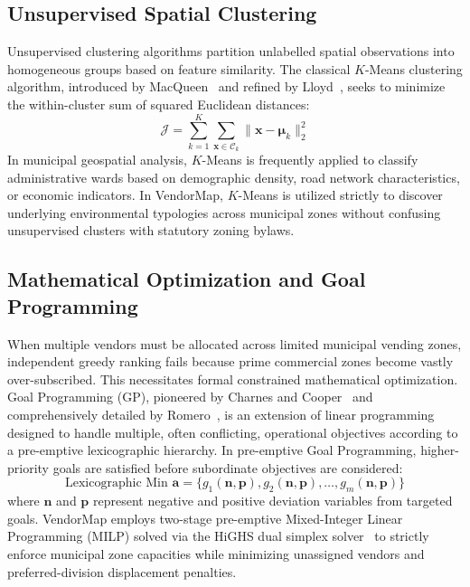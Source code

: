 \subsection{Unsupervised Spatial Clustering}
Unsupervised clustering algorithms partition unlabelled spatial observations into homogeneous groups based on feature similarity. The classical $K$-Means clustering algorithm, introduced by MacQueen~\cite{macqueen1967some} and refined by Lloyd~\cite{lloyd1982least}, seeks to minimize the within-cluster sum of squared Euclidean distances:
\begin{equation}
    \mathcal{J} = \sum_{k=1}^K \sum_{\mathbf{x} \in \mathcal{C}_k} \|\mathbf{x} - \mathbf{\mu}_k\|_2^2
    \label{eq:lit_kmeans}
\end{equation}
In municipal geospatial analysis, $K$-Means is frequently applied to classify administrative wards based on demographic density, road network characteristics, or economic indicators. In VendorMap, $K$-Means is utilized strictly to discover underlying environmental typologies across municipal zones without confusing unsupervised clusters with statutory zoning bylaws.

\subsection{Mathematical Optimization and Goal Programming}
When multiple vendors must be allocated across limited municipal vending zones, independent greedy ranking fails because prime commercial zones become vastly over-subscribed. This necessitates formal constrained mathematical optimization. Goal Programming (GP), pioneered by Charnes and Cooper~\cite{charnes1977goal} and comprehensively detailed by Romero~\cite{romero1991handbook}, is an extension of linear programming designed to handle multiple, often conflicting, operational objectives according to a pre-emptive lexicographic hierarchy. In pre-emptive Goal Programming, higher-priority goals are satisfied before subordinate objectives are considered:
\begin{equation}
    \text{Lexicographic Min } \mathbf{a} = \{g_1(\mathbf{n}, \mathbf{p}), g_2(\mathbf{n}, \mathbf{p}), \dots, g_m(\mathbf{n}, \mathbf{p})\}
    \label{eq:lit_gp}
\end{equation}
where $\mathbf{n}$ and $\mathbf{p}$ represent negative and positive deviation variables from targeted goals. VendorMap employs two-stage pre-emptive Mixed-Integer Linear Programming (MILP) solved via the HiGHS dual simplex solver~\cite{huang2023highs} to strictly enforce municipal zone capacities while minimizing unassigned vendors and preferred-division displacement penalties.

